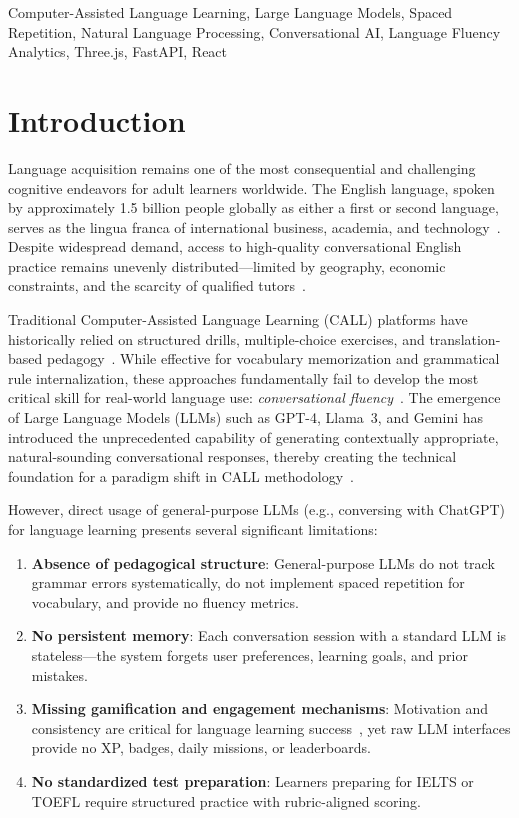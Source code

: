 \documentclass[conference]{IEEEtran}
\begin{document}
\begin{IEEEkeywords}
Computer-Assisted Language Learning, Large Language Models, Spaced Repetition, Natural Language Processing, Conversational AI, Language Fluency Analytics, Three.js, FastAPI, React
\end{IEEEkeywords}

\section{Introduction}

Language acquisition remains one of the most consequential and challenging cognitive endeavors for adult learners worldwide. The English language, spoken by approximately 1.5 billion people globally as either a first or second language, serves as the lingua franca of international business, academia, and technology~\cite{crystal2003}. Despite widespread demand, access to high-quality conversational English practice remains unevenly distributed---limited by geography, economic constraints, and the scarcity of qualified tutors~\cite{britishcouncil2013}.

Traditional Computer-Assisted Language Learning (CALL) platforms have historically relied on structured drills, multiple-choice exercises, and translation-based pedagogy~\cite{warschauer1998}. While effective for vocabulary memorization and grammatical rule internalization, these approaches fundamentally fail to develop the most critical skill for real-world language use: \textit{conversational fluency}~\cite{krashen1982}. The emergence of Large Language Models (LLMs) such as GPT-4, Llama~3, and Gemini has introduced the unprecedented capability of generating contextually appropriate, natural-sounding conversational responses, thereby creating the technical foundation for a paradigm shift in CALL methodology~\cite{achiam2023}.

However, direct usage of general-purpose LLMs (e.g., conversing with ChatGPT) for language learning presents several significant limitations:

\begin{enumerate}[leftmargin=*]
    \item \textbf{Absence of pedagogical structure}: General-purpose LLMs do not track grammar errors systematically, do not implement spaced repetition for vocabulary, and provide no fluency metrics.
    \item \textbf{No persistent memory}: Each conversation session with a standard LLM is stateless---the system forgets user preferences, learning goals, and prior mistakes.
    \item \textbf{Missing gamification and engagement mechanisms}: Motivation and consistency are critical for language learning success~\cite{dornyei2001}, yet raw LLM interfaces provide no XP, badges, daily missions, or leaderboards.
    \item \textbf{No standardized test preparation}: Learners preparing for IELTS or TOEFL require structured practice with rubric-aligned scoring.
\end{enumerate}
\end{document}
